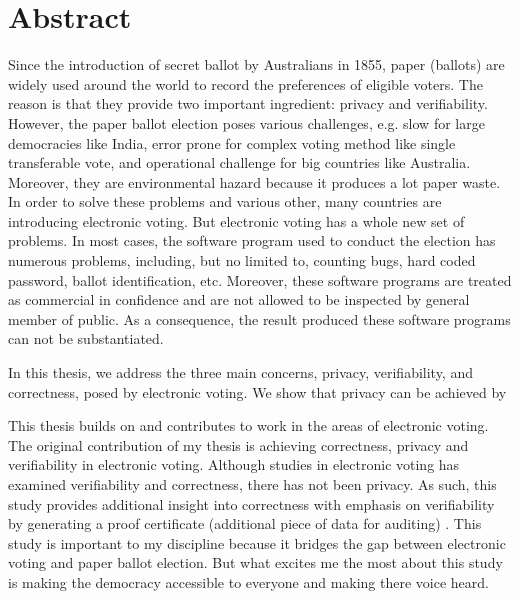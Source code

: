 \chapter*{Abstract}
\vspace{-1em}


Since the introduction of secret ballot by Australians in 1855, 
paper (ballots) are widely used around the world to record 
the preferences of eligible voters.
The reason is that they provide two important ingredient: privacy and verifiability. 
However, the paper ballot election poses various challenges, e.g.  
slow for large democracies like India, error prone for complex voting method like 
single transferable vote, and operational challenge for big countries like Australia.  
Moreover,  they are environmental hazard because it produces 
a lot paper waste.  In order to solve these problems and various other, 
many countries are introducing electronic voting. But electronic voting 
has a whole new set of problems. In most cases, the software program used 
to conduct the election has numerous problems, including, but no limited to, 
counting bugs, hard coded password, ballot identification, etc. Moreover, 
these software programs are treated as commercial in confidence and 
are not allowed to be inspected by general member of public. 
As a consequence, the result produced these software programs 
can not be substantiated. 

In this thesis, we address the three main concerns, privacy, verifiability, 
and correctness, posed by electronic voting. We show that privacy can be achieved 
by  

This thesis builds on and contributes to work in the areas of electronic voting. 
The original contribution of my thesis is achieving correctness, privacy and verifiability in 
electronic voting. Although studies in electronic voting has examined verifiability and correctness, 
there has not been privacy.   As such, this study provides additional insight into correctness with 
emphasis on verifiability by generating a proof certificate (additional piece of data for auditing) . 
This study is important to my discipline because it bridges the gap between electronic voting 
and paper ballot election. But what excites me the most about this study is making the democracy accessible to everyone
and making there voice heard. 

